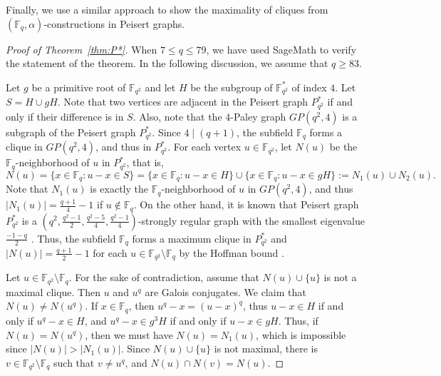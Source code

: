\documentclass[12pt,reqno]{amsart}
\theoremstyle{definition}
\newcommand{\F}{\mathbb{F}}
\begin{document}
Finally, we use a similar approach to show the maximality of cliques from $(\F_q,\alpha)$-constructions in Peisert graphs.

\begin{proof}[Proof of Theorem~\ref{thm:P*}]
When $7\leq q \leq 79$, we have used SageMath to verify the statement of the theorem. In the following discussion, we assume that $q \geq 83$.

Let $g$ be a primitive root of $\F_{q^2}$ and let $H$ be the subgroup of $\F_{q^2}^*$ of index $4$. Let $S=H \cup gH$.  Note that two vertices are adjacent in the Peisert graph $P_{q^2}^*$ if and only if their difference is in $S$. Also, note that the $4$-Paley graph $GP(q^2,4)$ is a subgraph of 
the Peisert graph $P_{q^2}^*$. Since $4 \mid (q+1)$, the subfield $\F_q$ forms a clique in $GP(q^2,4)$, and thus in $P_{q^2}^*$. For each vertex $u \in \F_{q^2}$, let $N(u)$ be the $\F_q$-neighborhood of $u$ in $P_{q^2}^*$, that is, 
$$
N(u)=\{x \in \F_q: u-x \in S\}=\{x \in \F_q: u-x \in H\} \cup \{x \in \F_q: u-x \in gH\}:=N_1(u) \cup N_2(u).
$$
Note that $N_1(u)$ is exactly the $\F_q$-neighborhood of $u$ in $GP(q^2,4)$, and thus $|N_1(u)|=\frac{q+1}{4}-1$ if $u \notin \F_q$. On the other hand, it is known that Peisert graph $P_{q^2}^*$ is a $(q^2, \frac{q^2-1}{2}, \frac{q^2-5}{4}, \frac{q^2-1}{4})$-strongly regular graph with the smallest eigenvalue $\frac{-1-q}{2}$ \cite{P01}. Thus, the subfield $\F_q$ forms a maximum clique in $P_{q^2}^*$ and $|N(u)|=\frac{q+1}{2}-1$ for each $u \in \F_{q^2} \setminus \F_q$ by the Hoffman bound \cite[Proposition 1.3.2]{BCN89}. 

Let $u \in \F_{q^2} \setminus \F_q$. For the sake of contradiction, assume that $N(u)\cup \{u\}$ is not a maximal clique. Then $u$ and $u^q$ are Galois conjugates. We claim that $N(u)\neq N(u^q)$. If $x \in \F_q$, then $u^q-x=(u-x)^q$, thus $u-x \in H$ if and only if $u^q-x \in H$, and $u^q-x \in g^3H$ if and only if $u-x \in gH$. Thus, if $N(u)=N(u^q)$, then we must have $N(u)=N_1(u)$, which is impossible since $|N(u)|>|N_1(u)|$. Since $N(u)\cup \{u\}$ is not maximal, there is $v \in \F_{q^2} \setminus \F_q$ such that $v \neq u^q$, and $N(u) \cap N(v)=N(u)$. 


\end{proof}
\end{document}
